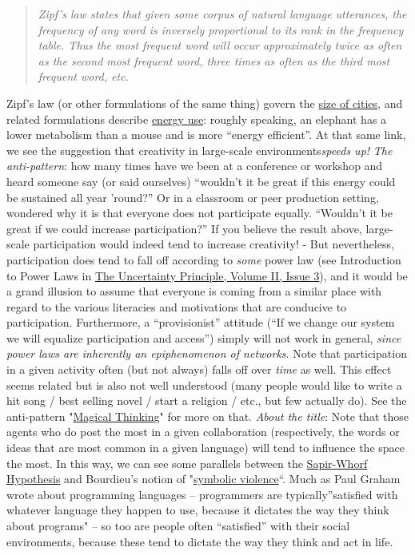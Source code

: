 \begin{quote}
\emph{Zipf's law states that given some corpus of natural language
utterances, the frequency of any word is inversely proportional to its
rank in the frequency table. Thus the most frequent word will occur
approximately twice as often as the second most frequent word, three
times as often as the third most frequent word, etc.}
\end{quote}
Zipf's law (or other formulations of the same thing) govern the
\href{http://www2.econ.uu.nl/users/marrewijk/geography/zipf/index.htm}{size
of cities}, and related formulations describe
\href{http://pricetags.wordpress.com/2010/10/26/kleibers-law-growth-and-creativity-in-cities/}{energy
use}: roughly speaking, an elephant has a lower metabolism than a mouse
and is more ``energy efficient''. At that same link, we see the
suggestion that creativity in large-scale environments\emph{speeds up!}
\emph{The anti-pattern}: how many times have we been at a conference or
workshop and heard someone say (or said ourselves) ``wouldn't it be
great if this energy could be sustained all year 'round?'' Or in a
classroom or peer production setting, wondered why it is that everyone
does not participate equally. ``Wouldn't it be great if we could
increase participation?'' If you believe the result above, large-scale
participation would indeed tend to increase creativity! - But
nevertheless, participation does tend to fall off according to
\emph{some} power law (see Introduction to Power Laws in
\href{http://www.theuncertaintyprinciple.danoff.org/v2i3.html}{The
Uncertainty Principle, Volume II, Issue 3}), and it would be a grand
illusion to assume that everyone is coming from a similar place with
regard to the various literacies and motivations that are conducive to
participation. Furthermore, a ``provisionist'' attitude (``If we change
our system we will equalize participation and access'') simply will not
work in general, \emph{since} \emph{power laws are inherently an
epiphenomenon of networks}. Note that participation in a given activity
often (but not always) falls off over \emph{time} as well. This effect
seems related but is also not well understood (many people would like to
write a hit song / best selling novel / start a religion / etc., but few
actually do). See the anti-pattern
"\href{http://peeragogy.org/antipatterns/magical-thinking/}{Magical
Thinking}" for more on that. \emph{About the title}: Note that those
agents who do post the most in a given collaboration (respectively, the
words or ideas that are most common in a given language) will tend to
influence the space the most. In this way, we can see some parallels
between the
\href{http://en.wikipedia.org/wiki/Linguistic\_relativity}{Sapir-Whorf
Hypothesis} and Bourdieu's notion of
"\href{http://en.wikipedia.org/wiki/Symbolic\_violence}{symbolic
violence}``. Much as Paul Graham wrote about programming languages --
programmers are typically''satisfied with whatever language they happen
to use, because it dictates the way they think about programs" -- so too
are people often ``satisfied'' with their social environments, because
these tend to dictate the way they think and act in life.
